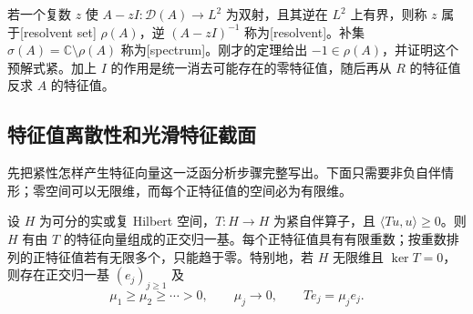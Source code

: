 若一个复数 \(z\) 使 \(A-zI:\mathcal D(A)\to L^2\) 为双射，且其逆在 \(L^2\) 上有界，则称 \(z\) 属于[resolvent set] \(\rho(A)\)，逆 \((A-zI)^{-1}\) 称为[resolvent]。补集 \(\sigma(A)=\mathbb C\setminus\rho(A)\) 称为[spectrum]。刚才的定理给出 \(-1\in\rho(A)\)，并证明这个预解式紧。加上 \(I\) 的作用是统一消去可能存在的零特征值，随后再从 \(R\) 的特征值反求 \(A\) 的特征值。

\subsection{特征值离散性和光滑特征截面}
\label{g3:subsec:1303:03}
先把紧性怎样产生特征向量这一泛函分析步骤完整写出。下面只需要非负自伴情形；零空间可以无限维，而每个正特征值的空间必为有限维。

\begin{theorem}[紧非负自伴算子的谱分解]\label{g3:thm:compact-positive-spectrum}
	设 \(H\) 为可分的实或复 Hilbert 空间，\(T:H\to H\) 为紧自伴算子，且 \(\langle Tu,u\rangle\ge0\)。则 \(H\) 有由 \(T\) 的特征向量组成的正交归一基。每个正特征值具有有限重数；按重数排列的正特征值若有无限多个，只能趋于零。特别地，若 \(H\) 无限维且 \(\ker T=0\)，则存在正交归一基 \((e_j)_{j\ge1}\) 及
	\[
		\mu_1\ge\mu_2\ge\cdots>0,\qquad
		\mu_j\longrightarrow0,\qquad Te_j=\mu_je_j.
	\]
\end{theorem}
